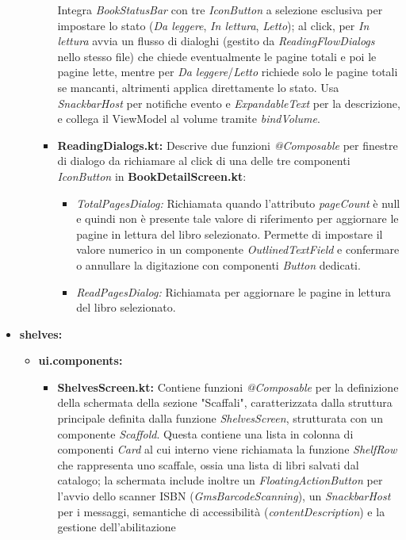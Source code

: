 \documentclass{article}
\begin{document}
\begin{itemize}
\begin{itemize}
\begin{itemize}
      Integra \textit{BookStatusBar} con tre \textit{IconButton} a selezione esclusiva per impostare lo stato (\textit{Da leggere}, \textit{In lettura}, \textit{Letto}); al click, 
      per \textit{In lettura} avvia un flusso di dialoghi (gestito da \textit{ReadingFlowDialogs} nello stesso file) che chiede eventualmente le pagine totali e poi le pagine lette, mentre per \textit{Da leggere}/\textit{Letto} 
      richiede solo le pagine totali se mancanti, altrimenti applica direttamente lo stato. Usa \textit{SnackbarHost} per notifiche evento e \textit{ExpandableText} per la descrizione, e collega il ViewModel al volume tramite \textit{bindVolume}.
      \item \textbf{ReadingDialogs.kt:} Descrive due funzioni \textit{@Composable} per finestre di dialogo da richiamare al click di una delle tre componenti \textit{IconButton} in \textbf{BookDetailScreen.kt}:
      \begin{itemize}
        \item \textit{TotalPagesDialog:} Richiamata quando l'attributo \textit{pageCount} è null e quindi non è presente tale valore di riferimento per aggiornare le pagine in lettura del libro selezionato.
        Permette di impostare il valore numerico in un componente \textit{OutlinedTextField} e confermare o annullare la digitazione con componenti \textit{Button} dedicati.
        \item \textit{ReadPagesDialog:} Richiamata per aggiornare le pagine in lettura del libro selezionato.
      \end{itemize}
    \end{itemize}
  \end{itemize}
  \item \textbf{shelves:}
  \begin{itemize}
    \item \textbf{ui.components:}
    \begin{itemize}
      \item \textbf{ShelvesScreen.kt:} Contiene funzioni \textit{@Composable} per la definizione della schermata della sezione "Scaffali", caratterizzata dalla struttura principale definita dalla funzione \textit{ShelvesScreen}, 
      strutturata con un componente \textit{Scaffold}. Questa contiene una lista in colonna di componenti \textit{Card} al cui interno viene richiamata la funzione \textit{ShelfRow} che rappresenta uno scaffale, ossia una lista di libri salvati dal catalogo; 
      la schermata include inoltre un \textit{FloatingActionButton} per l’avvio dello scanner ISBN (\textit{GmsBarcodeScanning}), un \textit{SnackbarHost} per i messaggi, semantiche di accessibilità (\textit{contentDescription}) e la gestione dell’abilitazione 

\end{itemize}
\end{itemize}
\end{itemize}
\end{document}
